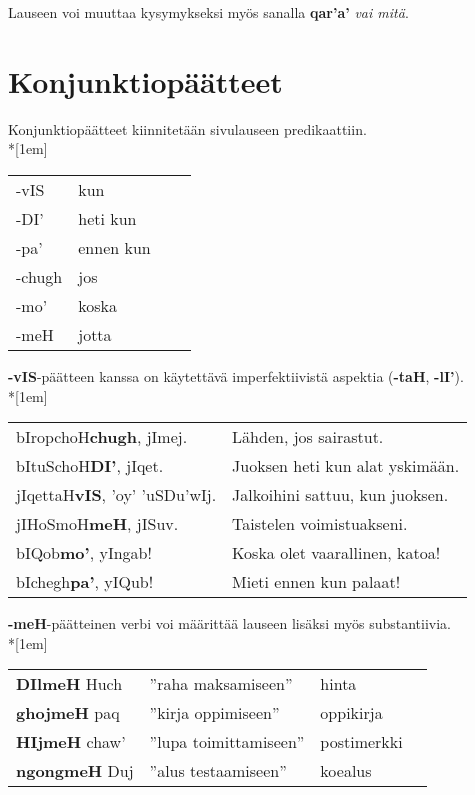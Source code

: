 \documentclass{book}
\begin{document}
Lauseen voi muuttaa kysymykseksi myös sanalla \textbf{qar'a'} \textit{vai mitä}.

\section{Konjunktiopäätteet}
\label{sec:konjunktiopaate}

Konjunktiopäätteet kiinnitetään sivulauseen predikaattiin.\\*[1em]
\begin{tabular}{Bl Il}
    -vIS & kun \\
    -DI' & heti kun \\
    -pa' & ennen kun \\
    -chugh & jos \\
    -mo' & koska \\
    -meH & jotta \\
\end{tabular}

\textbf{-vIS}-päätteen kanssa on käytettävä imperfektiivistä aspektia (\textbf{-taH}, \textbf{-lI'}).\\*[1em]
\begin{tabular}{l l}
    bIropchoH\textbf{chugh}, jImej. & Lähden, jos sairastut. \\
    bItuSchoH\textbf{DI'}, jIqet. & Juoksen heti kun alat yskimään. \\
    jIqettaH\textbf{vIS}, 'oy' 'uSDu'wIj. & Jalkoihini sattuu, kun juoksen. \\
    jIHoSmoH\textbf{meH}, jISuv. & Taistelen voimistuakseni. \\
    bIQob\textbf{mo'}, yIngab! & Koska olet vaarallinen, katoa! \\
    bIchegh\textbf{pa'}, yIQub! & Mieti ennen kun palaat! \\
\end{tabular}

\textbf{-meH}-päätteinen verbi voi määrittää lauseen lisäksi myös substantiivia.\\*[1em]
\begin{tabular}{l l Il}
    \textbf{DIlmeH} Huch & ''raha maksamiseen'' & hinta \\
    \textbf{ghojmeH} paq & ''kirja oppimiseen'' & oppikirja \\
    \textbf{HIjmeH} chaw' & ''lupa toimittamiseen'' & postimerkki \\
    \textbf{ngongmeH} Duj & ''alus testaamiseen'' & koealus \\
\end{tabular}
\end{document}
